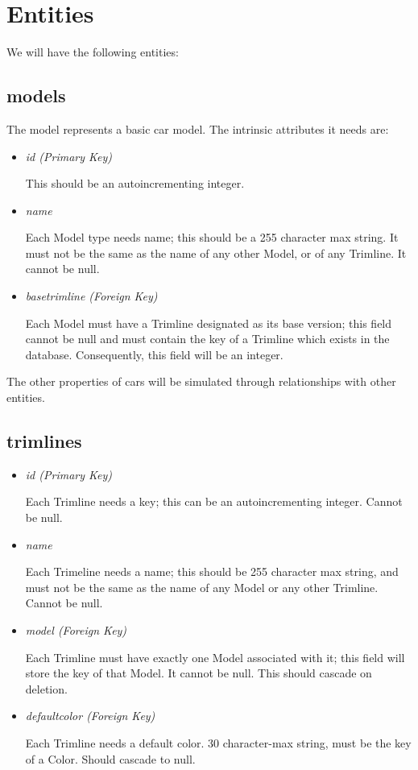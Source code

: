 \documentclass[11pt,letterpaper,oneside]{amsart}
\begin{document}
\section*{Entities}

We will have the following entities:

\subsection*{models}
The model represents a basic car model.  The intrinsic attributes it needs are:
\begin{itemize}
	\item \emph{id (Primary Key)}
	
	This should be an autoincrementing integer.
	
	\item \emph{name}
	
	Each Model type needs name; this should be a 255 character max string.  It must not be the same as the name of any other Model, or of any Trimline.  It cannot be null.
	
	\item \emph{base{\textunderscore}trimline (Foreign Key)}
	
	Each Model must have a Trimline designated as its base version; this field cannot be null and must contain the key of a Trimline which exists in the database.  Consequently, this field will be an integer.
	
	
\end{itemize}

The other properties of cars will be simulated through relationships with other entities.

\subsection*{trimlines}

\begin{itemize}
	\item \emph{id (Primary Key)}
	
	Each Trimline needs a key; this can be an autoincrementing integer. Cannot be null.
	
	\item \emph{name}
	
	Each Trimeline needs a name; this should be 255 character max string, and must not be the same as the name of any Model or any other Trimline.  Cannot be null.

	\item \emph{model (Foreign Key)}
	
	Each Trimline must have exactly one Model associated with it; this field will store the key of that Model.  It cannot be null.  This should cascade on deletion.
	
	\item \emph{default{\textunderscore}color (Foreign Key)}
	
	Each Trimline needs a default color.  30 character-max string, must be the key of a Color.  Should cascade to null.

\end{itemize}
\end{document}
